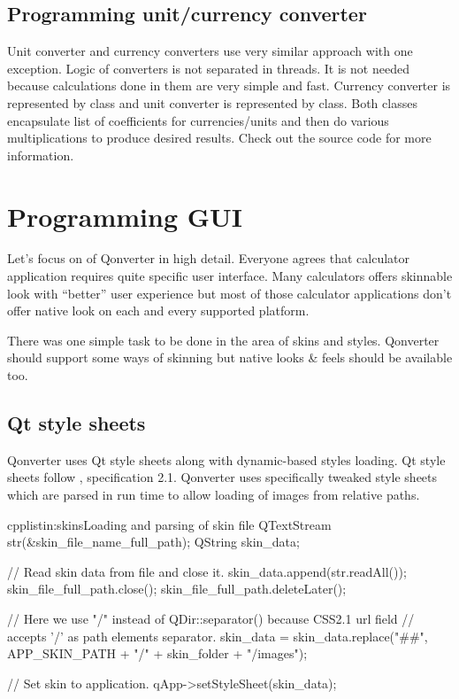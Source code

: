 \subsection{Programming unit/currency converter}
Unit converter and currency converters use very similar approach with one exception. Logic of converters is not separated in threads. It is not needed because calculations done in them are very simple and fast. Currency converter is represented by class and unit converter is represented by class. Both classes encapsulate list of coefficients for currencies/units and then do various multiplications to produce desired results. Check out the source code for more information.

\section{Programming GUI}
Let's focus on  of Qonverter in high detail. Everyone agrees that calculator application requires quite specific user interface. Many calculators offers skinnable look with \enquote{better} user experience but most of those calculator applications don't offer native look on each and every supported platform.

There was one simple task to be done in the area of skins and styles. Qonverter should support some ways of skinning but native looks \& feels should be available too.

\subsection{Qt style sheets}
Qonverter uses Qt style sheets \citep[style sheets]{various:qtdoc} along with dynamic-based styles loading. Qt style sheets follow , specification 2.1. Qonverter uses specifically tweaked style sheets which are parsed in run time to allow loading of images from relative paths.

\begin{fdoccode}{cpp}{listin:skins}{Loading and parsing of skin file}
QTextStream str(&skin_file_name_full_path);
QString skin_data;

// Read skin data from file and close it.
skin_data.append(str.readAll());
skin_file_full_path.close();
skin_file_full_path.deleteLater();

// Here we use "/" instead of QDir::separator() because CSS2.1 url field
// accepts '/' as path elements separator.
skin_data = skin_data.replace("##",
			APP_SKIN_PATH + "/" + skin_folder + "/images");

// Set skin to application.
qApp->setStyleSheet(skin_data);
\end{fdoccode}

